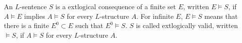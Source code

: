 An $L$-sentence $S$ is a 	ext{logical consequence} of a finite set $E$, written $E \models S$, if $A \models E$ implies $A \models S$ for every $L$-structure $A$. For infinite $E$, $E \models S$ means that there is a finite $E^0 \subset E$ such that $E^0 \models S$.
$S$ is called 	ext{logically valid}, written $\models S$, if $A \models S$ for every $L$-structure $A$.
